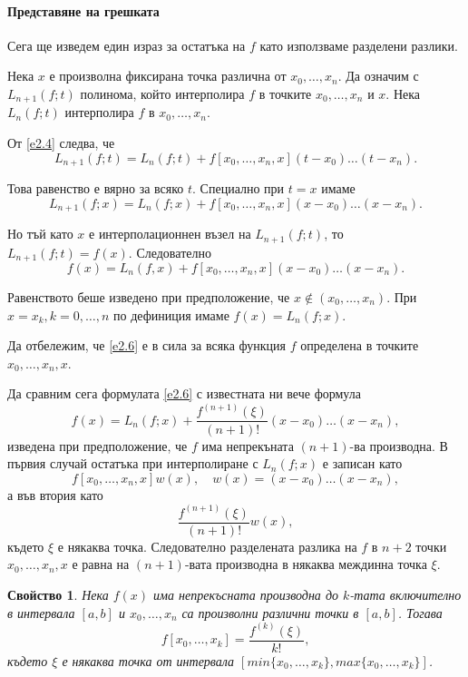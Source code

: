 \documentclass[12pt]{article}
\numberwithin{equation}{section}
\newtheorem{feature}{Свойство}
\numberwithin{theorem}{section}
\numberwithin{definition}{section}
\numberwithin{corollary}{section}
\begin{document}
\paragraph{Представяне на грешката}
\par
Сега ще изведем един израз за остатъка на $f$ като използваме разделени разлики.
\par
Нека $x$ е произволна фиксирана точка различна от $x_0,\dotso, x_n$. Да означим с $L_{n+1}(f;t)$ полинома, който интерполира $f$ в точките $x_0,\dotso, x_n$ и $x$. Нека $L_n(f;t)$ интерполира $f$ в $x_0,\dotso, x_n$.
\par
От \ref{e2.4} следва, че
\[
L_{n+1}(f;t) = L_n(f;t) +f[x_0, \dotso, x_n, x](t-x_0)\dotso(t-x_n).
\]
\par
Това равенство е вярно за всяко $t$. Специално при $t=x$ имаме
\[
L_{n+1}(f;x) = L_n(f;x) + f[x_0, \dotso, x_n, x](x-x_0)\dotso(x-x_n).
\]
\par
Но тъй като $x$ е интерполационнен възел на $L_{n+1}(f;t)$, то $L_{n+1}(f;t) = f(x)$. Следователно
\begin{equation}\label{e2.6}
f(x) = L_n(f,x) +f[x_0,\dotso, x_n,x](x-x_0)\dotso(x-x_n).
\end{equation}
\par
Равенството беше изведено при предположение, че $x\not\in(x_0, \dotso, x_n)$. При $x=x_k,k=0,\dotso, n$ по дефиниция имаме $f(x) = L_n(f;x)$.
\par
Да отбележим, че \ref{e2.6} е в сила за всяка функция $f$ определена в точките $x_0, \dotso, x_n,x$.
\par
Да сравним сега формулата \ref{e2.6} с известната ни вече формула 
\[
f(x) = L_n(f;x) + \frac{f^{(n+1)}(\xi)}{(n+1)!}(x-x_0)\dotso(x-x_n),
\]
изведена при предположение, че $f$ има непрекъната $(n+1)$-ва производна. В първия случай остатъка при интерполиране с $L_n(f;x)$ е записан като
\[
f[x_0, \dotso, x_n,x]w(x),\hspace{12pt}w(x) = (x-x_0)\dotso(x-x_n),
\]
а във втория като
\[
\frac{f^{(n+1)}(\xi)}{(n+1)!}w(x),
\]
където $\xi$ е някаква точка. Следователно разделената разлика на $f$ в $n+2$ точки $x_0, \dotso,x_n,x$ е равна на $(n+1)$-вата производна в някаква междинна точка $\xi$.
\begin{feature}\label{c2.2}
Нека $f(x)$ има непрекъсната производна до $k$-тата включително в интервала $[a,b]$ и $x_0,\dotso,x_n$ са произволни различни точки в $[a,b]$. Тогава 
\begin{equation}\label{e2.7}
f[x_0,\dotso,x_k] = \frac{f^(k)(\xi)}{k!},
\end{equation}
където $\xi$ е някаква точка от интервала $[min\{x_0,\dotso, x_k\}, max\{x_0,\dotso,x_k\}]$. 
\end{feature}
\end{document}
